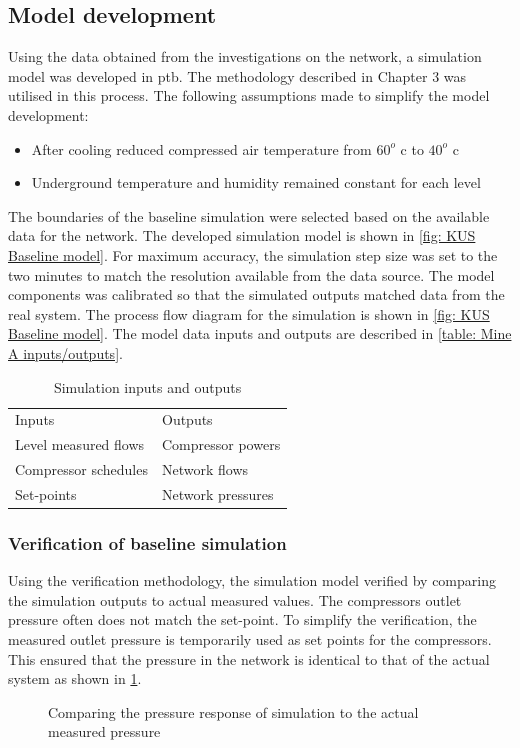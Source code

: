 \subsection{Model development}
	
Using the data obtained from the investigations on the network, a simulation model was developed in \gls{ptb}. The methodology described in Chapter 3 was utilised in this process. The following assumptions made to simplify the model development:
\begin{itemize}
	\item After cooling reduced compressed air temperature from $ 60 ^o $ \gls{c} to $ 40 ^o $ \gls{c}
	\item Underground temperature and humidity remained constant for each level
\end{itemize}
 The boundaries of the baseline simulation were selected based on the available data for the network. The developed simulation model is shown in \cref{fig: KUS Baseline model}. For maximum accuracy, the simulation step size was set to the two minutes to match the resolution available from the data source.
The model components was calibrated so that the simulated outputs matched data from the real system. The process flow diagram for the simulation is shown in \cref{fig: KUS Baseline model}. The model data inputs and outputs are described in \cref{table: Mine A inputs/outputs}.

\begin{table}[h]
	\centering
	\begin{tabular}{ll}
		\hline 
		Inputs \hspace*{4cm}    & Outputs \hspace*{4cm}    \\  \hhline{==}
		Level measured flows & Compressor powers \\
		Compressor schedules & Network flows \\
		Set-points & Network pressures \\
		\hline
	\end{tabular}
		\caption{Simulation inputs and outputs}
\label{table: Mine B inputs/outputs}
\end{table}
	
	\subsubsection{Verification of baseline simulation}
	Using the verification methodology, the simulation model verified by comparing the simulation outputs to actual measured values. The compressors outlet pressure often does not match the set-point. To simplify the verification, the measured outlet pressure is temporarily used as set points for the compressors. This ensured that the pressure in the network is identical to that of the actual system as shown in \cref{fig: Verification Pressure kusasalethu}.
	\par 
	\begin{figure}[h]
		\centering
		
		\caption{Comparing the pressure response of simulation to the actual measured pressure}
		\label{fig: Verification Pressure kusasalethu}
	\end{figure}

